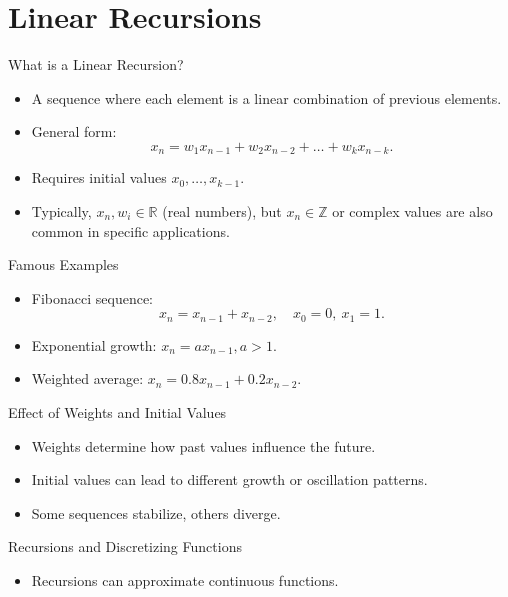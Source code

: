\documentclass{beamer}
\begin{document}
\section{Linear Recursions}
\begin{frame}{What is a Linear Recursion?}
\begin{itemize}
  \item A sequence where each element is a linear combination of previous elements.
  \item General form:
  \begin{equation}
    x_n = w_1 x_{n-1} + w_2 x_{n-2} + \dots + w_k x_{n-k}.
  \end{equation}
  \item Requires initial values \( x_0, \dots, x_{k-1} \).
  \item Typically, \( x_n, w_i \in \mathbb{R} \) (real numbers), but \( x_n \in \mathbb{Z} \) or complex values are also common in specific applications.
\end{itemize}
\end{frame}

\begin{frame}{Famous Examples}
\begin{itemize}
  \item Fibonacci sequence:
  \begin{equation}
    x_n = x_{n-1} + x_{n-2}, \quad x_0 = 0,\ x_1 = 1.
  \end{equation}
  \item Exponential growth: \( x_n = a x_{n-1}, a > 1. \)
  \item Weighted average: \( x_n = 0.8 x_{n-1} + 0.2 x_{n-2} \).
\end{itemize}
\end{frame}

\begin{frame}{Effect of Weights and Initial Values}
\begin{itemize}
  \item Weights determine how past values influence the future.
  \item Initial values can lead to different growth or oscillation patterns.
  \item Some sequences stabilize, others diverge.
\end{itemize}
\end{frame}

\begin{frame}{Recursions and Discretizing Functions}
\begin{itemize}
  \item Recursions can approximate continuous functions.
\end{itemize}
\end{frame}
\end{document}
